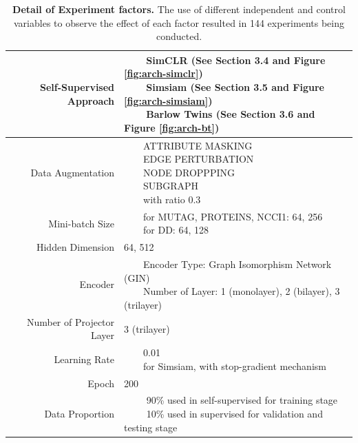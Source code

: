 \begin{table}[!htbp]
\centering
\begin{adjustwidth}{-.5in}{-.5in}  
\begin{tabular}{r|l}
\toprule
Self-Supervised Approach & \makecell[l]{
~~\llap{\textbullet}~~SimCLR (See Section 3.4 and Figure \ref{fig:arch-simclr}) \\
~~\llap{\textbullet}~~Simsiam (See Section 3.5 and Figure \ref{fig:arch-simsiam})\\
~~\llap{\textbullet}~~Barlow Twins (See Section 3.6 and Figure \ref{fig:arch-bt})} \\
\midrule
Data Augmentation & \makecell[l]{
~~\llap{\textbullet}~~\uppercase{attribute masking}\\
~~\llap{\textbullet}~~\uppercase{edge perturbation} \\
~~\llap{\textbullet}~~\uppercase{node droppping}\\
~~\llap{\textbullet}~~\uppercase{subgraph}\\
~~\llap{\textbullet}~~with ratio 0.3} \\
\midrule
Mini-batch Size & \makecell[l]{
~~\llap{\textbullet}~~for MUTAG, PROTEINS, NCCI1: 64, 256\\
~~\llap{\textbullet}~~for DD: 64, 128}\\
\midrule
Hidden Dimension & 64, 512\\
\midrule
Encoder & \makecell[l]{~~\llap{\textbullet}~~Encoder Type: Graph Isomorphism Network (GIN)\\
~~\llap{\textbullet}~~Number of Layer: 1 (monolayer), 2 (bilayer), 3 (trilayer)} \\
\midrule
Number of Projector Layer & 3 (trilayer)\\
\midrule
Learning Rate & \makecell[l]{~~\llap{\textbullet}~~0.01\\
~~\llap{\textbullet}~~for Simsiam, with stop-gradient mechanism}\\
\midrule
Epoch  & 200\\
\midrule
Data Proportion & \makecell[l]{
~~\llap{\textbullet}~~ 90\% used in self-supervised for training stage\\
~~\llap{\textbullet}~~ 10\% used in supervised for validation and testing stage}
\\


\bottomrule
\end{tabular}
\end{adjustwidth}
\vspace{0.5cm}
\caption[Detail of experiment factors]{\textbf{Detail of Experiment factors.} The use of different independent and control variables to observe the effect of each factor resulted in 144 experiments being conducted.}
		\label{tab:expfactor}
	\end{table}


